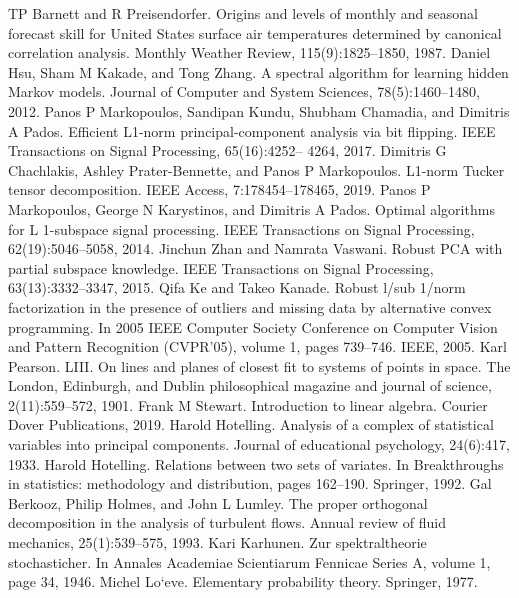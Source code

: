 \documentclass[preprint,12pt]{elsarticle}
\begin{document}
\begin{thebibliography}{000}
 TP Barnett and R Preisendorfer. Origins and levels of monthly and seasonal forecast skill for United States surface air temperatures determined by canonical correlation analysis. Monthly Weather Review, 115(9):1825–1850, 1987. 
 Daniel Hsu, Sham M Kakade, and Tong Zhang. A spectral algorithm for learning hidden Markov models. Journal of Computer and System Sciences, 78(5):1460–1480, 2012. 
 Panos P Markopoulos, Sandipan Kundu, Shubham Chamadia, and Dimitris A Pados. Efficient L1-norm principal-component analysis via bit flipping. IEEE Transactions on Signal Processing, 65(16):4252– 4264, 2017. 
 Dimitris G Chachlakis, Ashley Prater-Bennette, and Panos P Markopoulos. L1-norm Tucker tensor decomposition. IEEE Access, 7:178454–178465, 2019. 
 Panos P Markopoulos, George N Karystinos, and Dimitris A Pados. Optimal algorithms for L {1}-subspace signal processing. IEEE Transactions on Signal Processing, 62(19):5046–5058, 2014. 
 Jinchun Zhan and Namrata Vaswani. Robust PCA with partial subspace knowledge. IEEE Transactions on Signal Processing, 63(13):3332–3347, 2015. 
 Qifa Ke and Takeo Kanade. Robust l/sub 1/norm factorization in the presence of outliers and missing data by alternative convex programming. In 2005 IEEE Computer Society Conference on Computer Vision and Pattern Recognition (CVPR’05), volume 1, pages 739–746. IEEE, 2005. 
 Karl Pearson. LIII. On lines and planes of closest fit to systems of points in space. The London, Edinburgh, and Dublin philosophical magazine and journal of science, 2(11):559–572, 1901. 
 Frank M Stewart. Introduction to linear algebra. Courier Dover Publications, 2019. 
 Harold Hotelling. Analysis of a complex of statistical variables into principal components. Journal of educational psychology, 24(6):417, 1933. 
 Harold Hotelling. Relations between two sets of variates. In Breakthroughs in statistics: methodology and distribution, pages 162–190. Springer, 1992. 
 Gal Berkooz, Philip Holmes, and John L Lumley. The proper orthogonal decomposition in the analysis of turbulent flows. Annual review of fluid mechanics, 25(1):539–575, 1993. 
 Kari Karhunen. Zur spektraltheorie stochasticher. In Annales Academiae Scientiarum Fennicae Series A, volume 1, page 34, 1946. 
 Michel Lo`eve. Elementary probability theory. Springer, 1977. 

\end{thebibliography}
\end{document}
